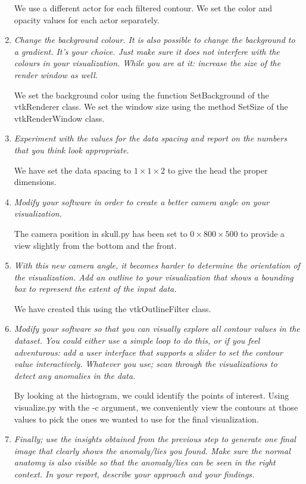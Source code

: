 \documentclass{article}[10pt]
\begin{document}
\begin{enumerate}
We use a different actor for each filtered contour. We set the color and opacity
values for each actor separately.

    \item \textit{Change the background colour. It is also possible to change
the background to a gradient. It’s your choice. Just make sure it does not
interfere with the colours in your visualization. While you are at it: increase
the size of the render window as well.}

We set the background color using the function \textsf{SetBackground} of the
\textsf{vtkRenderer} class. We set the window size using the method
\textsf{SetSize} of the \textsf{vtkRenderWindow} class.

    \item \textit{Experiment with the values for the data spacing and report on
the numbers that you think look appropriate.}

We have set the data spacing to $1 \times 1 \times 2$ to give the head the
proper dimensions.

    \item \textit{Modify your software in order to create a better camera angle
on your visualization.}

The camera position in \textsf{skull.py} has been set to $0 \times 800 \times
500$ to provide a view slightly from the bottom and the front.

    \item \textit{With this new camera angle, it becomes harder to determine the
orientation of the visualization. Add an outline to your visualization that
shows a bounding box to represent the extent of the input data.}

We have created this using the \textsf{vtkOutlineFilter} class.

    \item \textit{Modify your software so that you can visually explore all
contour values in the dataset. You could either use a simple loop to do this, or
if you feel adventurous: add a user interface that supports a slider to set the
contour value interactively. Whatever you use; scan through the visualizations
to detect any anomalies in the data.}

By looking at the histogram, we could identify the points of interest. Using
\textsf{visualize.py} with the \textsf{-c} argument, we conveniently view the
contours at those values to pick the ones we wanted to use for the final
visualization.

    \item \textit{Finally; use the insights obtained from the previous step to
generate one final image that clearly shows the anomaly/lies you found. Make
sure the normal anatomy is also visible so that the anomaly/lies can be seen in
the right context. In your report, describe your approach and your findings.}


\end{enumerate}
\end{document}
